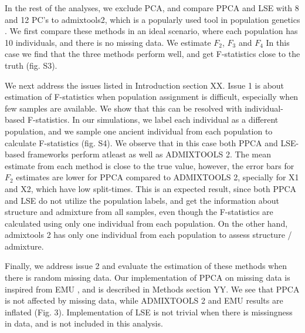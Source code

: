 \documentclass[12pt, letterpaper]{article}
\begin{document}
In the rest of the analyses, we exclude PCA, and compare PPCA and LSE with 8 and 12 PC's to admixtools2, which is a popularly used tool in population genetics \cite{maier_limits_2022}. We first compare these methods in an ideal scenario, where each population has 10 individuals, and there is no missing data. We estimate $F_2$, $F_3$ and $F_4$  In this case we find that the three methods perform well, and get F-statistics close to the truth (fig. S3). 

We next address the issues listed in Introduction section XX. Issue 1 is about estimation of F-statistics when population assignment is difficult, especially when few samples are available. We show that this can be resolved with individual-based F-statistics. In our simulations, we label each individual as a different population, and we sample one ancient individual from each population to calculate F-statistics (fig. S4). We observe that in this case both PPCA and LSE- based frameworks perform atleast as well as ADMIXTOOLS 2. The mean estimate from each method is close to the true value, however, the error bars for $F_2$ estimates are lower for PPCA compared to ADMIXTOOLS 2, specially for X1 and X2, which have low split-times. This is an expected result, since both PPCA and LSE do not utilize the population labels, and get the information about structure and admixture from all samples, even though the F-statistics are calculated using only one individual from each population. On the other hand, admixtools 2 has only one individual from each population to assess structure / admixture.     

Finally, we address issue 2 and evaluate the estimation of these methods when there is random missing data. Our implementation of PPCA on missing data is inspired from EMU \cite{meisner_large-scale_2021}, and is described in Methods section YY. We see that PPCA is not affected by missing data, while ADMIXTOOLS 2 and EMU results are inflated (Fig. 3). Implementation of LSE is not trivial when there is missingness in data, and is not included in this analysis. 
\end{document}

